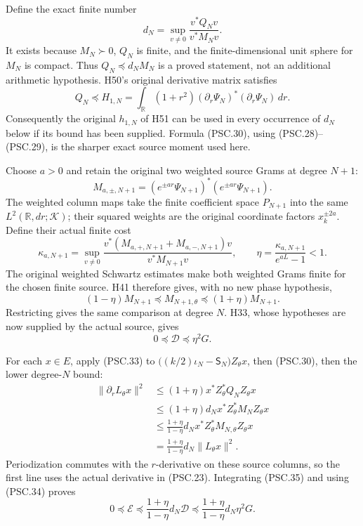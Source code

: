Define the exact finite number
\[
 d_N=\sup_{v\ne0}\frac{v^*Q_Nv}{v^*M_Nv}.
 \tag{PSC.30}
\]
It exists because \(M_N\succ0\), \(Q_N\) is finite, and the finite-dimensional unit sphere for \(M_N\) is compact. Thus \(Q_N\preceq d_NM_N\) is a proved statement, not an additional arithmetic hypothesis. H50's original derivative matrix satisfies
\[
 Q_N\preceq H_{1,N}
 =\int_{\mathbb R}(1+r^2)(\partial_r\Psi_N)^*
                 (\partial_r\Psi_N)\,dr .
 \tag{PSC.31}
\]
Consequently the original \(h_{1,N}\) of H51 can be used in every occurrence of \(d_N\) below if its bound has been supplied. Formula (PSC.30), using (PSC.28)–(PSC.29), is the sharper exact source moment used here.

Choose \(a>0\) and retain the original two weighted source Grams at degree \(N+1\):
\[
 M_{a,\pm,N+1}
 =(e^{\pm ar}\Psi_{N+1})^*(e^{\pm ar}\Psi_{N+1}).
\]
The weighted column maps take the finite coefficient space \(P_{N+1}\) into the same \(L^2(\mathbb R,dr;\mathcal K)\); their squared weights are the original coordinate factors \(x_k^{\pm2a}\). Define their actual finite cost
\[
 \kappa_{a,N+1}
 =\sup_{v\ne0}
 \frac{v^*(M_{a,+,N+1}+M_{a,-,N+1})v}
      {v^*M_{N+1}v},\qquad
 \eta=\frac{\kappa_{a,N+1}}{e^{aL}-1}<1.
 \tag{PSC.32}
\]
The original weighted Schwartz estimates make both weighted Grams finite for the chosen finite source. H41 therefore gives, with no new phase hypothesis,
\[
 (1-\eta)M_{N+1}\preceq M_{N+1,\theta}
                  \preceq(1+\eta)M_{N+1}.
 \tag{PSC.33}
\]
Restricting gives the same comparison at degree \(N\). H33, whose hypotheses are now supplied by the actual source, gives
\[
 0\preceq\mathscr D\preceq\eta^2G.
 \tag{PSC.34}
\]

For each \(x\in E\), apply (PSC.33) to
\(\bigl((k/2)\iota_N-\mathsf S_N\bigr)Z_\theta x\), then (PSC.30), then the lower degree-\(N\) bound:
\[
 \begin{aligned}
 \|\partial_rL_\theta x\|^2
 &\leq(1+\eta)x^*Z_\theta^*Q_NZ_\theta x\\
 &\leq(1+\eta)d_Nx^*Z_\theta^*M_NZ_\theta x\\
 &\leq\frac{1+\eta}{1-\eta}d_N
          x^*Z_\theta^*M_{N,\theta}Z_\theta x\\
 &=\frac{1+\eta}{1-\eta}d_N\|L_\theta x\|^2.
 \end{aligned}
 \tag{PSC.35}
\]
Periodization commutes with the \(r\)-derivative on these source columns, so the first line uses the actual derivative in (PSC.23). Integrating (PSC.35) and using (PSC.34) proves
\[
 0\preceq\mathscr E
 \preceq\frac{1+\eta}{1-\eta}d_N\mathscr D
 \preceq\frac{1+\eta}{1-\eta}d_N\eta^2G.
 \tag{PSC.36}
\]

